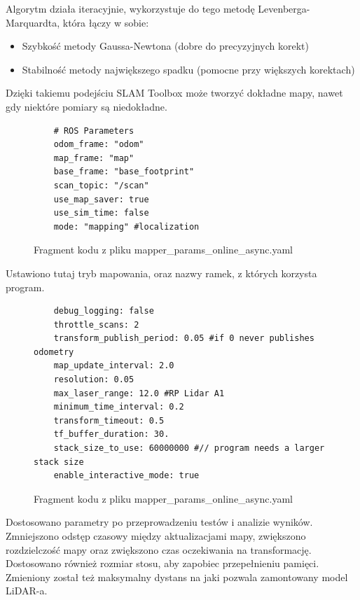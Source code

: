 \documentclass[a4paper,twoside,12pt]{book}
\begin{document}
\begin{itemize}
Algorytm działa iteracyjnie, wykorzystuje do tego metodę Levenberga-Marquardta, która łączy w sobie:

\begin{itemize}
\item Szybkość metody Gaussa-Newtona (dobre do precyzyjnych korekt)
\item Stabilność metody największego spadku (pomocne przy większych korektach)
\end{itemize}

Dzięki takiemu podejściu SLAM Toolbox może tworzyć dokładne mapy, nawet gdy niektóre pomiary są niedokładne.

\begin{figure}[!hb]
	\centering
\begin{lstlisting}
	# ROS Parameters
    odom_frame: "odom"
    map_frame: "map"
    base_frame: "base_footprint"
    scan_topic: "/scan"
    use_map_saver: true
    use_sim_time: false
    mode: "mapping" #localization
\end{lstlisting}
\caption{Fragment kodu z pliku mapper\_params\_online\_async.yaml}
\label{fig:mapper-params2}
\end{figure}
Ustawiono tutaj tryb mapowania, oraz nazwy ramek, z których korzysta program.
\newline
\newpage
\begin{figure}[!hb]
	\centering
\begin{lstlisting}
	debug_logging: false
    throttle_scans: 2
    transform_publish_period: 0.05 #if 0 never publishes odometry
    map_update_interval: 2.0
    resolution: 0.05
    max_laser_range: 12.0 #RP Lidar A1
    minimum_time_interval: 0.2
    transform_timeout: 0.5
    tf_buffer_duration: 30.
    stack_size_to_use: 60000000 #// program needs a larger stack size
    enable_interactive_mode: true
\end{lstlisting}
\caption{Fragment kodu z pliku mapper\_params\_online\_async.yaml}
\label{fig:mapper-params3}
\end{figure}
Dostosowano parametry po przeprowadzeniu testów i analizie wyników. Zmniejszono odstęp czasowy między aktualizacjami mapy, zwiększono rozdzielczość mapy oraz zwiększono czas oczekiwania na transformację. Dostosowano również rozmiar stosu, aby zapobiec przepełnieniu pamięci. Zmieniony został też maksymalny dystans na jaki pozwala zamontowany model LiDAR-a.
\end{itemize}
\newpage
\end{document}
